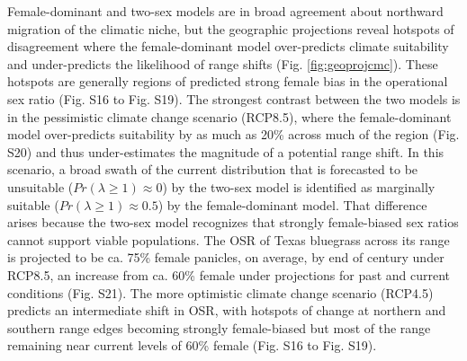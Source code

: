 \documentclass[9pt,twocolumn,twoside,lineno]{pnas-new}
\begin{document}
Female-dominant and two-sex models are in broad agreement about northward migration of the climatic niche, but the geographic projections reveal hotspots of disagreement where the female-dominant model over-predicts climate suitability and under-predicts the likelihood of range shifts (Fig. \ref{fig:geoprojcmc}). 
These hotspots are generally regions of predicted strong female bias in the operational sex ratio (Fig. S16 to Fig. S19). 
The strongest contrast between the two models is in the pessimistic climate change scenario (RCP8.5), where the female-dominant model over-predicts suitability by as much as 20\% across much of the region (Fig. S20) and thus under-estimates the magnitude of a potential range shift. 
In this scenario, a broad swath of the current distribution that is forecasted to be unsuitable ($Pr(\lambda \ge 1) \approx 0$) by the two-sex model is identified as marginally suitable ($Pr(\lambda \ge 1) \approx 0.5$) by the female-dominant model. 
That difference arises because the two-sex model recognizes that strongly female-biased sex ratios cannot support viable populations. 
The OSR of Texas bluegrass across its range is projected to be ca. 75\% female panicles, on average, by end of century under RCP8.5, an increase from ca. 60\% female under projections for past and current conditions (Fig. S21). 
The more optimistic climate change scenario (RCP4.5) predicts an intermediate shift in OSR, with hotspots of change at northern and southern range edges becoming strongly female-biased but most of the range remaining near current levels of 60\% female (Fig. S16 to Fig. S19). 
\end{document}
